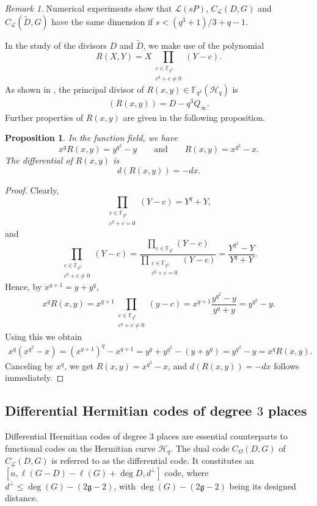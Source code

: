 \documentclass[11pt]{amsart}
\theoremstyle{plain}
\newtheorem{proposition}[theorem]{Proposition}
\theoremstyle{definition}
\theoremstyle{remark}
\newtheorem*{remark}{Remark}
\newcommand{\g}{\mathfrak{g}}
\begin{document}
\begin{remark}
Numerical experiments show that $\mathscr{L}(sP)$, $C_{\mathcal{L}}(D,G)$ and $C_{\mathcal{L}}(\widetilde{D},G)$ have the same dimension if $s<(q^3+1)/3+q-1$. 
\end{remark}


In the study of the divisors $D$ and $\widetilde{D}$, we make use of the polynomial 
\[R(X,Y) = X \prod\limits_{\substack{c \in \mathbb{F}_{q^2} \\ c^q + c \neq 0}} (Y-c).\] 
As shown in \cite[Section~2]{korchmaros2013hermitian}, the principal divisor of $R(x,y) \in \mathbb{F}_{q^2}(\mathscr{H}_q)$ is
\begin{align} \label{eq:Rxy-pricdiv}
(R(x,y)) = D-q^3 Q_\infty.
\end{align}
Further properties of $R(x,y)$ are given in the following proposition.
\begin{proposition} \label{pr:Rxy-props}
In the function field, we have 
\[x^{q}R(x, y) = y^{q^2} - y \qquad \text{and} \qquad R(x, y) = x^{q^2} - x.\]
The differential of $R(x,y)$ is 
\[d(R(x,y))=-dx. \]
\end{proposition} 
\begin{proof}
Clearly,
\[\prod\limits_{\substack{c \in \mathbb{F}_{q^2} \\ c^q + c = 0}} (Y-c) = Y^q+Y,\]
and
\[\prod\limits_{\substack{c \in \mathbb{F}_{q^2} \\ c^q + c \neq 0}} (Y-c) = \frac{\prod\limits_{c \in \mathbb{F}_{q^2}} (Y-c)}{\prod\limits_{\substack{c \in \mathbb{F}_{q^2} \\ c^q + c = 0}} (Y-c)} = \frac{Y^{q^2}-Y}{Y^q+Y}.\]
Hence, by $x^{q+1}=y+y^q$, 
\[x^qR(x,y) = x^{q+1} \prod\limits_{\substack{c \in \mathbb{F}_{q^2} \\ c^q + c \neq 0}} (y-c) = x^{q+1}\frac{y^{q^2}-y}{y^q+y} = y^{q^2}-y.\]
Using this we obtain
\begin{align*}
x^q(x^{q^2}-x) = (x^{q+1})^q-x^{q+1} = y^q+y^{q^2} - (y+y^q) = y^{q^2}-y = x^qR(x,y).
\end{align*}
Canceling by $x^q$, we get $R(x,y)=x^{q^2}-x$, and $d(R(x,y))=-dx$ follows immediately. 
\end{proof}

\subsection{Differential Hermitian codes of degree $3$ places}

Differential Hermitian codes of degree $3$ places are essential counterparts to functional codes on the Hermitian curve $\mathscr{H}_q$. The dual code $C_{\Omega}(D,G)$ of $C_{\mathcal{L}}(D,G)$ is referred to as the differential code. It constitutes an $[n, \ell(G -D)-\ell(G) +\deg D, d^{\perp}]$ code, where $d^{\perp} \leq \deg(G) - (2\g -2)$, with $\deg(G) - (2\g -2)$ being its designed distance.
\end{document}
